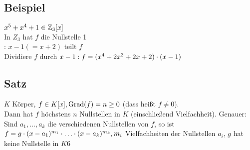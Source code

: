 \subsection{Beispiel}\label{sec:1.31}
$x^5 + x^4 + 1 \in \mathbb{Z}_3[x]$\\
In $Z_3$ hat $f$ die Nullstelle 1\\
: $x-1 (= x + 2)$ teilt $f$\\
Dividiere $f$ durch $x-1:\\
f = (x^4 + 2x^3 + 2x + 2) \cdot (x - 1)$
\subsection{Satz}\label{sec:1.32}
$K$ Körper, $f \in K[x], \operatorname{Grad}(f) = n \geq 0$ (dass hei\ss t $f \ne 0$).\\
Dann hat $f$ höchstens $n$ Nullstellen in $K$ (einschlie\ss end Vielfachheit). Genauer: Sind $a_1,\ldots,a_k$ die verschiedenen Nullstellen von $f$, so ist \\$f = g \cdot (x-a_1)^{m_1} \cdot \ldots \cdot (x-a_k)^{m_k}, m_i$ Vielfachheiten der Nullstellen $a_i$, $g$ hat keine Nullstelle in $K6$
